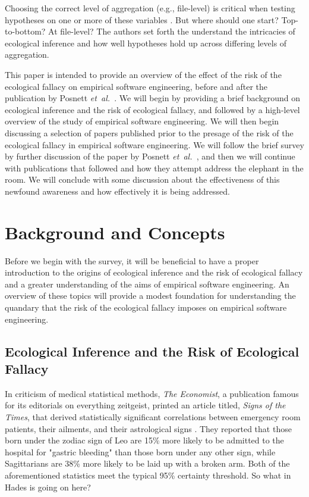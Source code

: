 \documentclass{sig-alternate-05-2015}
\newcommand{\etal}{\mbox{\emph{et al.\ }}}
\begin{document}
Choosing the correct level of aggregation (e.g., file-level) is critical when testing hypotheses on one or more of these variables \cite{Posnett:2011}.  But where should one start? Top-to-bottom? At file-level?  The authors set forth the understand the intricacies of ecological inference and how well hypotheses hold up across differing levels of aggregation.

This paper is intended to provide an overview of the effect of the risk of the ecological fallacy on empirical software engineering, before and after the publication by Posnett \etal.   We will begin by providing a brief background on ecological inference and the risk of ecological fallacy, and followed by a high-level overview of the study of empirical software engineering.  We will then begin discussing a selection of papers published prior to the presage of the risk of the ecological fallacy in empirical software engineering. We will follow the brief survey by further discussion of the paper by Posnett \etal, and then we will continue with publications that followed and how they attempt address the elephant in the room.  We will conclude with some discussion about the effectiveness of this newfound awareness and how effectively it is being addressed.

\section{Background and Concepts}

Before we begin with the survey, it will be beneficial to have a proper introduction to the origins of ecological inference and the risk of ecological fallacy and a greater understanding of the aims of empirical software engineering.  An overview of these topics will provide a modest foundation for understanding the quandary that the risk of the ecological fallacy imposes on empirical software engineering.

\subsection{Ecological Inference and the Risk of Ecological Fallacy}
In criticism of medical statistical methods, \emph{The Economist}, a publication famous for its editorials on everything zeitgeist, printed an article titled, \emph{Signs of the Times}, that derived statistically significant correlations between emergency room patients, their ailments, and their astrological signs \cite{Economist:2007}.  They reported that those born under the zodiac sign of Leo are 15\% more likely to be admitted to the hospital for "gastric bleeding" than those born under any other sign, while Sagittarians are 38\% more likely to be laid up with a broken arm.  Both of the aforementioned statistics meet the typical 95\% certainty threshold.  So what in Hades is going on here?
\end{document}
